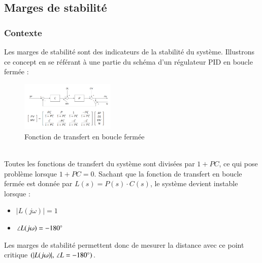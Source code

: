 \subsection{Marges de stabilité}
\subsubsection{Contexte}
Les marges de stabilité sont des indicateurs de la stabilité du système. 
Illustrons ce concept en se référant à une partie du schéma d'un régulateur PID en boucle fermée : 
\begin{figure}[h]
    \centering
    \includegraphics[width=0.4\textwidth]{figures/unityfeedback.png}
    \caption{Fonction de transfert en boucle fermée}
    \label{fig:unityfeedback}
\end{figure}
\\Toutes les fonctions de transfert du système sont divisées par $1+PC$, ce qui pose problème lorsque $1+PC = 0$.
Sachant que la fonction de transfert en boucle fermée est donnée par $L(s) = P(s)\cdot C(s)$, le système devient instable lorsque : 
\begin{itemize}
    \item $|L(j\omega)| = 1$
    \item $\angle L(j\omega) = -180\degree$
\end{itemize}
Les marges de stabilité permettent donc de mesurer la distance avec ce point critique $(|L(j\omega)|,\, \angle L = -180\degree)$. 
